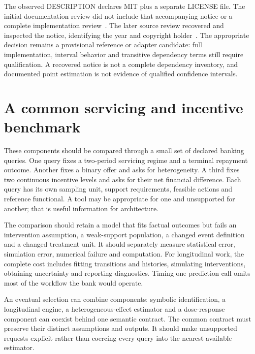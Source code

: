 The observed DESCRIPTION declares MIT plus a separate LICENSE file. The
initial documentation review did not include that accompanying notice or a
complete implementation review~\citep{v13_sw_causaldrf}. The later source
review recovered and inspected the notice, identifying the year and copyright
holder~\citep{v131_sw_causaldrf}. The appropriate decision remains a provisional
reference or adapter candidate: full implementation, interval behavior and
transitive dependency terms still require qualification. A recovered notice
is not a complete dependency inventory, and documented point estimation is
not evidence of qualified confidence intervals.

\section{A common servicing and incentive benchmark}

These components should be compared through a small set of declared banking
queries. One query fixes a two-period servicing regime and a terminal repayment
outcome. Another fixes a binary offer and asks for heterogeneity. A third fixes
two continuous incentive levels and asks for their net financial difference.
Each query has its own sampling unit, support requirements, feasible actions
and reference functional. A tool may be appropriate for one and unsupported
for another; that is useful information for architecture.

The comparison should retain a model that fits factual outcomes but fails an
intervention assumption, a weak-support population, a changed event definition
and a changed treatment unit. It should separately measure statistical error,
simulation error, numerical failure and computation. For longitudinal work,
the complete cost includes fitting transitions and histories, simulating
interventions, obtaining uncertainty and reporting diagnostics. Timing one
prediction call omits most of the workflow the bank would operate.

An eventual selection can combine components: symbolic identification, a
longitudinal engine, a heterogeneous-effect estimator and a dose-response
component can coexist behind one semantic contract. The common contract must
preserve their distinct assumptions and outputs. It should make unsupported
requests explicit rather than coercing every query into the nearest available
estimator.
